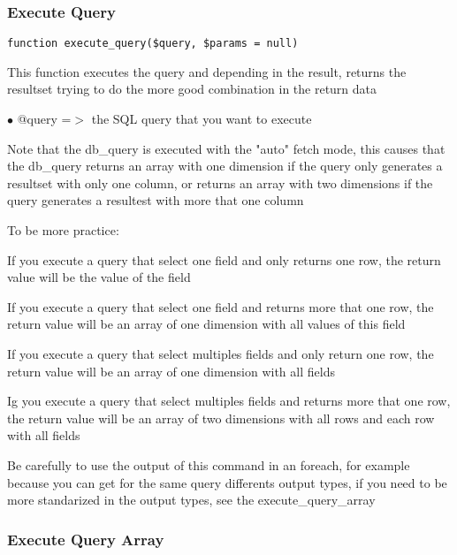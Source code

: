 \documentclass[a4paper]{article}
\begin{document}
\hypertarget{toc218}{}
\subsubsection{Execute Query}

\begin{lstlisting}
function execute_query($query, $params = null)
\end{lstlisting}

This function executes the query and depending in the result, returns the
resultset trying to do the more good combination in the return data

\begin{compactitem}
\item[\color{myblue}$\bullet$] @query =$>$ the SQL query that you want to execute
\end{compactitem}

Note that the db\_query is executed with the "auto" fetch mode, this causes
that the db\_query returns an array with one dimension if the query only
generates a resultset with only one column, or returns an array with two
dimensions if the query generates a resultest with more that one column

To be more practice:

If you execute a query that select one field and only returns one row,
the return value will be the value of the field

If you execute a query that select one field and returns more that one
row, the return value will be an array of one dimension with all values
of this field

If you execute a query that select multiples fields and only return one
row, the return value will be an array of one dimension with all fields

Ig you execute a query that select multiples fields and returns more that
one row, the return value will be an array of two dimensions with all rows
and each row with all fields

Be carefully to use the output of this command in an foreach, for example
because you can get for the same query differents output types, if you
need to be more standarized in the output types, see the execute\_query\_array

\hypertarget{toc219}{}
\subsubsection{Execute Query Array}
\end{document}
